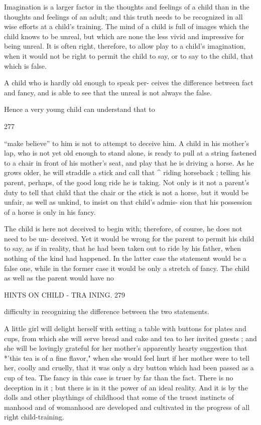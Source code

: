 \documentclass[
]{book}
\begin{document}
Imagination is a larger factor in the thoughts and feelings of a child than in the thoughts and feelings of an adult; and this truth needs to be recognized in all wise efforts at a child's training. The mind of a child is full of images which the child knows to be unreal, but which are none the less vivid and impressive for being unreal. It is often right, therefore, to allow play to a child's imagination, when it would not be right to permit the child to say, or to say to the child, that which is false.

A child who is hardly old enough to speak per- ceives the difference between fact and fancy, and is able to see that the unreal is not always the false.

Hence a very young child can understand that to

277

``make believe'' to him is not to attempt to deceive him. A child in his mother's lap, who is not yet old enough to stand alone, is ready to pull at a string fastened to a chair in front of his mother's seat, and play that he is driving a horse. As he grows older, he will straddle a stick and call that \^{} riding horseback ; telling his parent, perhaps, of the good long ride he is taking. Not only is it not a parent's duty to tell that child that the chair or the stick is not a horse, but it would be unfair, as well as unkind, to insist on that child's admis- sion that his possession of a horse is only in his fancy.

The child is here not deceived to begin with; therefore, of course, he does not need to be un- deceived. Yet it would be wrong for the parent to permit his child to say, as if in reality, that he had been taken out to ride by his father, when nothing of the kind had happened. In the latter case the statement would be a false one, while in the former case it would be only a stretch of fancy. The child as well as the parent would have no

HINTS ON CHILD - TRA INING. 279

difficulty in recognizing the difference between the two statements.

A little girl will delight herself with setting a table with buttons for plates and cups, from which she will serve bread and cake and tea to her invited guests ; and she will be lovingly grateful for her mother's apparently hearty suggestion that *'this tea is of a fine flavor," when she would feel hurt if her mother were to tell her, coolly and cruelly, that it was only a dry button which had been passed as a cup of tea. The fancy in this case is truer by far than the fact. There is no deception in it ; but there is in it the power of an ideal reality. And it is by the dolls and other playthings of childhood that some of the truest instincts of manhood and of womanhood are developed and cultivated in the progress of all right child-training.
\end{document}
